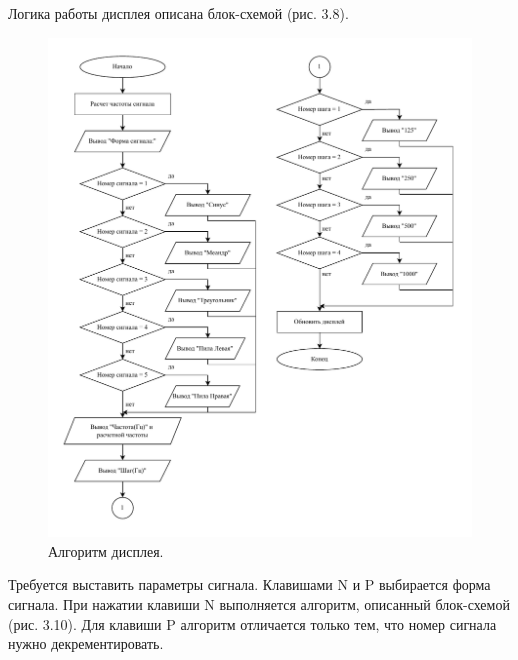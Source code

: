 	Логика работы дисплея описана блок-схемой (рис. 3.8).
	
	\begin{figure}[H]
    \centering
    \includegraphics[width=1\textwidth]{../image/display.pdf}
    \caption{Алгоритм дисплея.}
	\end{figure}	
	
	Требуется выставить параметры сигнала. Клавишами N и P выбирается форма сигнала. При нажатии клавиши N выполняется алгоритм, описанный блок-схемой (рис. 3.10). Для клавиши P алгоритм отличается только тем, что номер сигнала нужно декрементировать.
	
